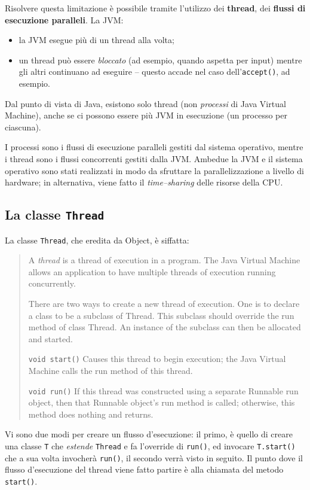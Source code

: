 \documentclass[\fontsizeclass,twocolumn]{\classname}
\theoremstyle{definition}
\theoremstyle{definition}
\begin{document}
Risolvere questa limitazione è possibile tramite l'utilizzo dei
\textbf{thread}, dei \textbf{flussi di esecuzione paralleli}. La JVM:

\begin{itemize}
    \item la JVM esegue più di un thread alla volta;
    \item un thread può essere \emph{bloccato} (ad esempio, quando aspetta per
        input) mentre gli altri continuano ad eseguire -- questo accade nel
        caso dell'\texttt{ac\-cept()}, ad esempio.
\end{itemize}

Dal punto di vista di Java, esistono solo thread (non \emph{processi} di Java
Virtual Machine), anche se ci possono essere più JVM in esecuzione (un processo
per ciascuna). 

I processi sono i flussi di esecuzione paralleli gestiti dal sistema operativo,
mentre i thread sono i flussi concorrenti gestiti dalla JVM. Ambedue la JVM e
il sistema operativo sono stati realizzati in modo da sfruttare la
parallelizzazione a livello di hardware; in alternativa, viene fatto il
\emph{time--sharing} delle risorse della CPU.

\subsection{La classe \texttt{Thread}}

La classe \texttt{Thread}, che eredita da Object, è siffatta:
\begin{quote}
    \footnotesize{A \emph{thread} is a thread of execution in a program. The Java Virtual Machine allows an application to have multiple threads of execution running concurrently.

There are two ways to create a new thread of execution. One is to declare a class to be a subclass of Thread. This subclass should override the run method of class Thread. An instance of the subclass can then be allocated and started.

\texttt{void 	start()} 	Causes this thread to begin execution; the Java Virtual Machine calls the run method of this thread.

\texttt{void 	run()} 	If this thread was constructed using a separate Runnable run object, then that Runnable object's run method is called; otherwise, this method does nothing and returns.}
\end{quote}

Vi sono due modi per creare un flusso d'esecuzione: il primo, è quello di
creare una classe \texttt{T} che \emph{estende} \texttt{Thread} e fa l'override
di \texttt{run()}, ed invocare \texttt{T.start()} che a sua volta invocherà
\texttt{run()}, il secondo verrà visto in seguito. Il punto dove il flusso
d'esecuzione del thread viene fatto partire è alla chiamata del metodo
\texttt{start()}.
\end{document}
